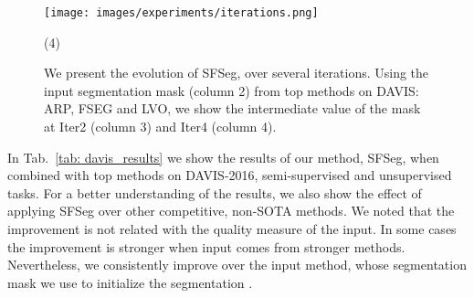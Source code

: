 \documentclass{article}
\begin{document}
\begin{figure}[!h]
	\begin{center}
		\texttt{[image: images/experiments/iterations.png]}
		\vspace*{-2mm}
		\begin{tasks}(4)
        \end{tasks}
	\end{center}
	\caption{We present the evolution of SFSeg, over several iterations. Using the input segmentation mask (column 2) from top methods on DAVIS: ARP, FSEG and LVO, we show the intermediate value of the mask at Iter2 (column 3) and Iter4 (column 4).}
	\label{fig: qualitative_iterations}
\end{figure}


In Tab.~\ref{tab: davis_results} we show the results of our method, SFSeg, when combined with top methods on DAVIS-2016, semi-supervised and unsupervised tasks. For a better understanding of the results, we also show the effect of applying SFSeg over other competitive, non-SOTA methods. We noted that the improvement is not related with the quality measure of the input. In some cases the improvement is stronger when input comes from stronger methods. Nevertheless, we consistently improve over the input method, whose segmentation mask we use to initialize the segmentation .
\end{document}
